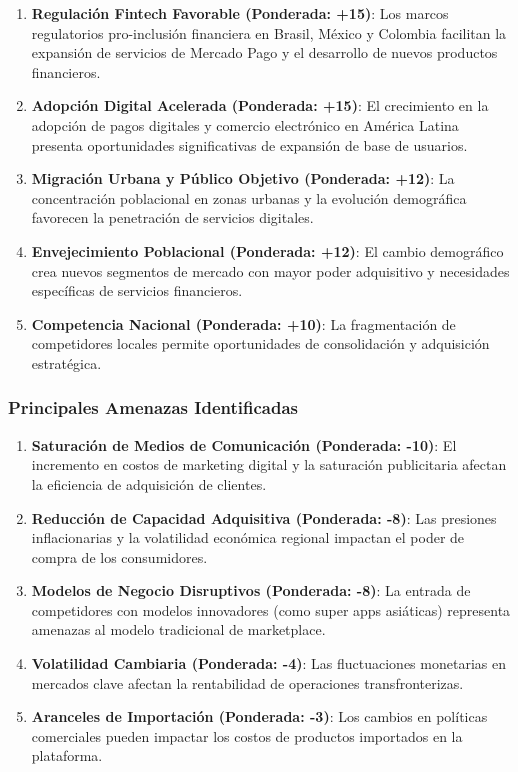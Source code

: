 \begin{enumerate}
\item \textbf{Regulación Fintech Favorable (Ponderada: +15)}: Los marcos regulatorios pro-inclusión financiera en Brasil, México y Colombia facilitan la expansión de servicios de Mercado Pago y el desarrollo de nuevos productos financieros.

\item \textbf{Adopción Digital Acelerada (Ponderada: +15)}: El crecimiento en la adopción de pagos digitales y comercio electrónico en América Latina presenta oportunidades significativas de expansión de base de usuarios.

\item \textbf{Migración Urbana y Público Objetivo (Ponderada: +12)}: La concentración poblacional en zonas urbanas y la evolución demográfica favorecen la penetración de servicios digitales.

\item \textbf{Envejecimiento Poblacional (Ponderada: +12)}: El cambio demográfico crea nuevos segmentos de mercado con mayor poder adquisitivo y necesidades específicas de servicios financieros.

\item \textbf{Competencia Nacional (Ponderada: +10)}: La fragmentación de competidores locales permite oportunidades de consolidación y adquisición estratégica.
\end{enumerate}

\subsubsection{Principales Amenazas Identificadas}

\begin{enumerate}
\item \textbf{Saturación de Medios de Comunicación (Ponderada: -10)}: El incremento en costos de marketing digital y la saturación publicitaria afectan la eficiencia de adquisición de clientes.

\item \textbf{Reducción de Capacidad Adquisitiva (Ponderada: -8)}: Las presiones inflacionarias y la volatilidad económica regional impactan el poder de compra de los consumidores.

\item \textbf{Modelos de Negocio Disruptivos (Ponderada: -8)}: La entrada de competidores con modelos innovadores (como super apps asiáticas) representa amenazas al modelo tradicional de marketplace.

\item \textbf{Volatilidad Cambiaria (Ponderada: -4)}: Las fluctuaciones monetarias en mercados clave afectan la rentabilidad de operaciones transfronterizas.

\item \textbf{Aranceles de Importación (Ponderada: -3)}: Los cambios en políticas comerciales pueden impactar los costos de productos importados en la plataforma.
\end{enumerate}

